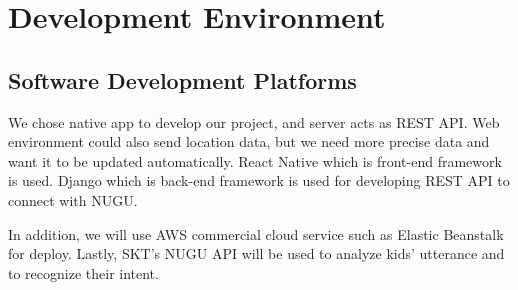 \documentclass[conference]{IEEEtran}
\begin{document}
\section{Development Environment}
\subsection{Software Development Platforms}
We chose native app to develop our project, and server acts as REST API. Web environment could also send location data, but we need more precise data and want it to be updated automatically. React Native which is front-end framework is used. Django which is back-end framework is used for developing REST API to connect with NUGU.

In addition, we will use AWS commercial cloud service such as Elastic Beanstalk for deploy. Lastly, SKT’s NUGU API will be used to analyze kids’ utterance and to recognize their intent.
\end{document}
